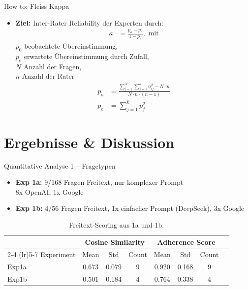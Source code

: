 \documentclass[usenames, dvipsnames, aspectratio=32]{beamer}
\begin{document}
\begin{frame}{How to: Fleiss Kappa}
    \begin{itemize}
        \item \textbf{Ziel:} Inter-Rater Reliability der Experten durch:
        \begin{align*}
            \kappa &= \frac{p_o - p_e}{1 - p_e}, \text{ mit}
        \end{align*}
        $p_0$ beobachtete Übereinstimmung, \\ $p_e$ erwartete Übereinstimmung durch Zufall, \\
        $N$ Anzahl der Fragen, \\
        $n$ Anzahl der Rater
        \begin{align*}
            p_o &= \frac{\sum_{i=1}^{N}\sum_{j=1}^{k} n_{ij}^2-N\cdot n}{N\cdot n\cdot (n-1)} \\
            p_e &= \sum_{j=1}^{k} p_j^2
        \end{align*}
    \end{itemize}
\end{frame}

\section{Ergebnisse \& Diskussion}

\begin{frame}{Quantitative Analyse 1 -- Fragetypen}
    \begin{itemize}
        \item \textbf{Exp 1a:} 9/168 Fragen Freitext, nur komplexer Prompt\\ 8x OpenAI, 1x Google
        \item \textbf{Exp 1b:} 4/56 Fragen Freitext, 1x einfacher Prompt (DeepSeek), 3x Google
    \end{itemize}
    {\scriptsize
    \begin{table}[htbp]
    \centering
    \caption{Freitext-Scoring aus 1a und 1b.}
    \label{tab:free_text_scores}
    \begin{tabular}{lccccccc}
        \toprule
        & \multicolumn{3}{c}{Cosine Similarity} & \multicolumn{3}{c}{Adherence Score} \\
        \cmidrule(lr){2-4} \cmidrule(lr){5-7}
        Experiment & Mean & Std & Count & Mean & Std & Count \\
        \midrule
        Exp1a & 0.673 & 0.079 & 9 & 0.920 & 0.168 & 9 \\
        Exp1b & 0.501 & 0.184 & 4 & 0.764 & 0.338 & 4 \\
        \bottomrule
    \end{tabular}
    \end{table}}
\end{frame}
\end{document}
